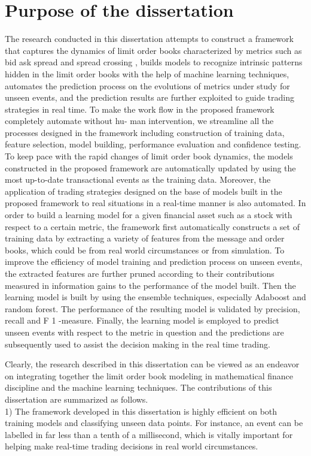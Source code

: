 \section{Purpose of the dissertation}
The research conducted in this dissertation attempts to construct a framework that captures
the dynamics of limit order books characterized by metrics such as bid ask spread and spread crossing , builds models to recognize intrinsic patterns hidden in the limit order books with the help of
machine learning techniques, automates the prediction process on the evolutions of metrics under
study for unseen events, and the prediction results are further exploited to guide trading strategies
in real time. To make the work flow in the proposed framework completely automate without hu-
man intervention, we streamline all the processes designed in the framework including construction
of training data, feature selection, model building, performance evaluation and confidence testing.
To keep pace with the rapid changes of limit order book dynamics, the models constructed in the
proposed framework are automatically updated by using the most up-to-date transactional events
as the training data. Moreover, the application of trading strategies designed on the base of models
built in the proposed framework to real situations in a real-time manner is also automated.
In order to build a learning model for a given financial asset such as a stock with respect to a
certain metric, the framework first automatically constructs a set of training data by extracting a
variety of features from the message and order books, which could be from real world circumstances
or from simulation. To improve the efficiency of model training and prediction process on unseen
events, the extracted features are further pruned according to their contributions measured in information gains to the performance of the model built. Then the learning model is built by using the
ensemble techniques, especially Adaboost and random forest. The performance
of the resulting model is validated by precision, recall and F 1 -measure. 
Finally, the learning model is employed to predict unseen events with respect to the metric in question and the predictions are subsequently used to assist the decision making in the real time trading.

Clearly, the research described in this dissertation can be viewed as an endeavor on integrating
together the limit order book modeling in mathematical finance discipline and the machine learning
techniques. The contributions of this dissertation are summarized as follows.\\
1) The framework developed in this dissertation is highly efficient on both training models and
classifying unseen data points. For instance, an event can be labelled in far less than a tenth
of a millisecond, which is vitally important for helping make real-time trading decisions in
real world circumstances.

